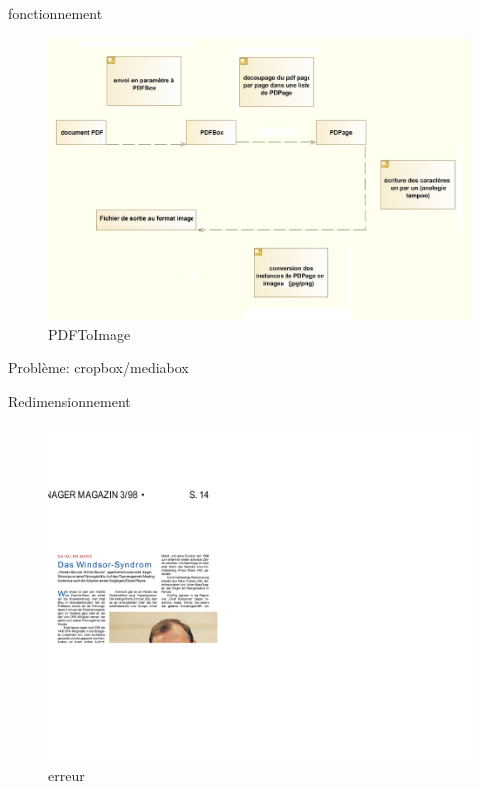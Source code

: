 \begin{frame}{fonctionnement}
		\begin{figure}[h]
        			\begin{center}
         			\includegraphics[scale=0.30]{images/pdfboxTraitement.png} 
        			\end{center}
        			\caption{PDFToImage}
        			\label{PDFToImage}
    		\end{figure}
\end{frame}

\begin{frame}{Problème: cropbox/mediabox}
	\begin{block}{Redimensionnement}
		\begin{figure}[h]
        		\begin{center}
         		\includegraphics[scale=0.08]{images/fail1.jpg} 
        		\end{center}
        		\caption{erreur}
        		\label{erreur}
    		\end{figure}
	\end{block}
\end{frame}

